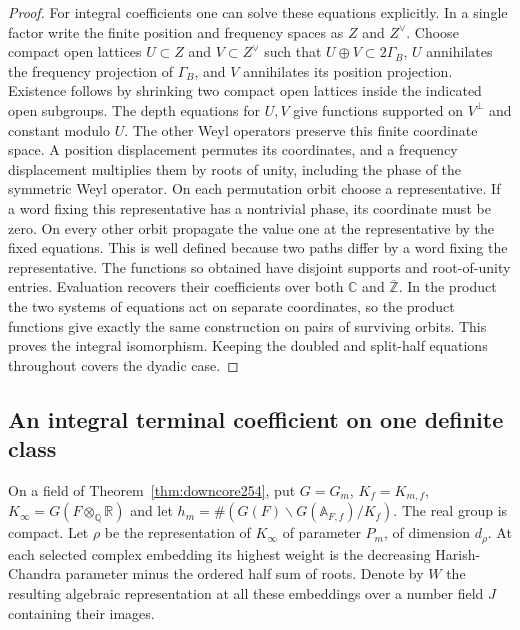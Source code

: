 \documentclass[a4paper,11pt]{article}
\theoremstyle{definition}
\theoremstyle{remark}
\newcommand{\RR}{\mathbb R}\newcommand{\CC}{\mathbb C}\newcommand{\QQ}{\mathbb Q}
\newcommand{\ZZ}{\mathbb Z}\newcommand{\ord}{\operatorname{ord}}
\numberwithin{equation}{section}
\begin{document}
\begin{proof}
For integral coefficients one can solve these equations explicitly.
In a single factor write the finite position and frequency spaces
as \(Z\) and \(Z^\vee\). Choose compact open lattices \(U\subset Z\)
and \(V\subset Z^\vee\) such that \(U\oplus V\subset 2\Gamma_B\),
\(U\) annihilates the frequency projection of \(\Gamma_B\), and \(V\)
annihilates its position projection. Existence follows by shrinking
two compact open lattices inside the indicated open subgroups.
The depth equations for \(U,V\) give functions supported on
\(V^\perp\) and constant modulo \(U\). The other Weyl operators
preserve this finite coordinate space. A position displacement
permutes its coordinates, and a frequency displacement multiplies
them by roots of unity, including the phase of the symmetric Weyl
operator. On each permutation orbit choose a representative. If a
word fixing this representative has a nontrivial phase, its coordinate
must be zero. On every other orbit propagate the value one at the
representative by the fixed equations. This is well defined because
two paths differ by a word fixing the representative. The functions
so obtained have disjoint supports and root-of-unity entries.
Evaluation recovers their coefficients over both \(\CC\) and
\(\overline{\ZZ}\). In the product the two systems of equations
act on separate coordinates, so the product functions give exactly
the same construction on pairs of surviving orbits. This proves
the integral isomorphism. Keeping the doubled and split-half
equations throughout covers the dyadic case.
\end{proof}

\subsection{An integral terminal coefficient on one definite class}\label{nav:VI-37}
On a field of Theorem~\ref{thm:downcore254}, put \(G=G_m\),
\(K_f=K_{m,f}\), \(K_\infty=G(F\otimes_\QQ\RR)\) and let
\(h_m=\#(G(F)\backslash G(\mathbb A_{F,f})/K_f)\).
The real group is compact. Let \(\rho\) be the representation
of \(K_\infty\) of parameter \(P_m\), of dimension \(d_\rho\).
At each selected complex embedding its highest weight is the
decreasing Harish-Chandra parameter minus the ordered half sum
of roots. Denote by \(W\) the resulting algebraic representation
at all these embeddings over a number field \(J\) containing
their images.
\end{document}
